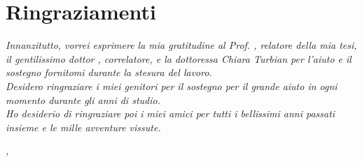 \cleardoublepage
{}
{}

\begingroup
\let\clearpage\relax
\let\cleardoublepage\relax
\let\cleardoublepage\relax

\chapter*{Ringraziamenti}

\noindent \textit{Innanzitutto, vorrei esprimere la mia gratitudine al Prof. \myProf, relatore della mia tesi, il gentilissimo dottor \myTutor, correlatore, e la dottoressa Chiara Turbian per l'aiuto e il sostegno fornitomi durante la stesura del lavoro.}\\

\noindent \textit{Desidero ringraziare i miei genitori per il sostegno per il grande aiuto in ogni momento durante gli anni di studio.}\\

\noindent \textit{Ho desiderio di ringraziare poi i miei amici per tutti i bellissimi anni passati insieme e le mille avventure vissute.}\\

\bigskip

\noindent\textit{\myLocation, \myTime}
\hfill \myName

\endgroup
